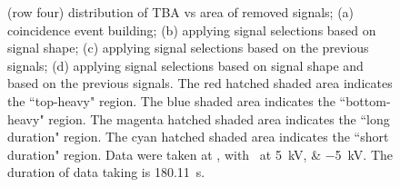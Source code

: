 \begin{landscape}
\begin{figure}[!p]
{			(row four) distribution of TBA vs area of removed signals;
			(a) coincidence event building; 
			(b) applying signal selections based on signal shape;
			(c) applying signal selections based on the previous signals;
			(d) applying signal selections based on signal shape and based on the previous signals.
			The red hatched shaded area indicates the ``top-heavy" region.
			The blue shaded area indicates the ``bottom-heavy" region.
			The magenta hatched shaded area indicates the ``long duration" region.
			The cyan hatched shaded area indicates the ``short duration" region.
			Data were taken at , with \opvtvb\ at \SIlist{+5;-5}{kV}. The duration of data taking is \SI{180.11}{\s}.
		}
		\label{fig:signal selection dv 10}
	\end{figure}
\end{landscape}

